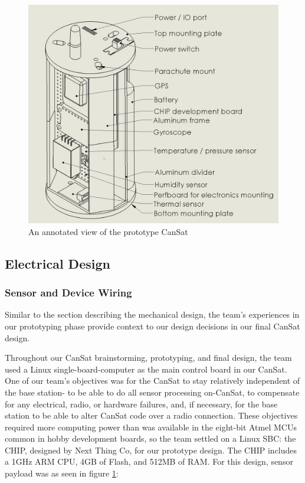 \documentclass[]{report}
\begin{document}
	 	\begin{figure}[h]
	 		\hfill\includegraphics[scale=0.2]{annotated_cansat.png}\hspace*{\fill}
	 		\caption{An annotated view of the prototype CanSat}
	 		\label{anoldcan}
	 	\end{figure}
 		\subsection{Electrical Design}
 		\subsubsection{Sensor and Device Wiring}
 		Similar to the section describing the mechanical design, the team's experiences in our prototyping phase provide context to our design decisions in our final CanSat design.
 		
 		Throughout our CanSat brainstorming, prototyping, and final design, the team used a Linux single-board-computer as the main control board in our CanSat. One of our team's objectives was for the CanSat to stay relatively independent of the base station- to be able to do all sensor processing on-CanSat, to compensate for any electrical, radio, or hardware failures, and, if necessary, for the base station to be able to alter CanSat code over a radio connection. These objectives required more computing power than was available in the eight-bit Atmel MCUs common in hobby development boards, so the team settled on a Linux SBC: the CHIP, designed by Next Thing Co, for our prototype design. The CHIP includes a 1GHz ARM CPU, 4GB of Flash, and 512MB of RAM. For this design, sensor payload was as seen in figure \ref{anoldcan}: 
 		
\end{document}
